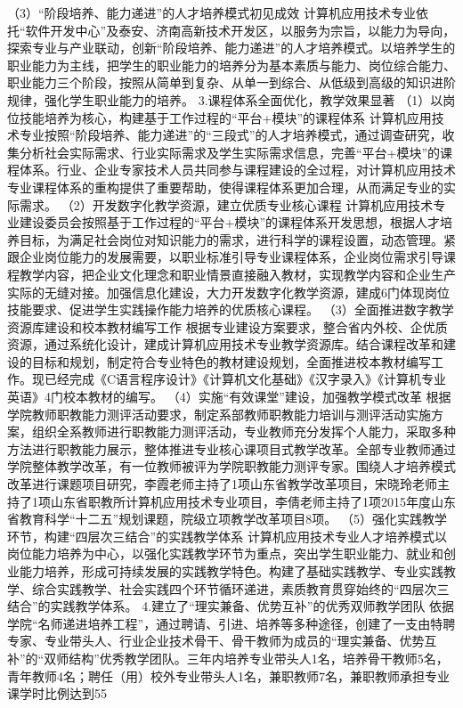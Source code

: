 （3）“阶段培养、能力递进”的人才培养模式初见成效
计算机应用技术专业依托“软件开发中心”及泰安、济南高新技术开发区，以服务为宗旨，以能力为导向，探索专业与产业联动，创新“阶段培养、能力递进”的人才培养模式。以培养学生的职业能力为主线，把学生的职业能力的培养分为基本素质与能力、岗位综合能力、职业能力三个阶段，按照从简单到复杂、从单一到综合、从低级到高级的知识进阶规律，强化学生职业能力的培养。
3.课程体系全面优化，教学效果显著
（1）以岗位技能培养为核心，构建基于工作过程的“平台+模块”的课程体系
计算机应用技术专业按照“阶段培养、能力递进”的“三段式”的人才培养模式，通过调查研究，收集分析社会实际需求、行业实际需求及学生实际需求信息，完善“平台+模块”的课程体系。行业、企业专家技术人员共同参与课程建设的全过程，对计算机应用技术专业课程体系的重构提供了重要帮助，使得课程体系更加合理，从而满足专业的实际需求。
（2）开发数字化教学资源，建立优质专业核心课程
计算机应用技术专业建设委员会按照基于工作过程的“平台+模块”的课程体系开发思想，根据人才培养目标，为满足社会岗位对知识能力的需求，进行科学的课程设置，动态管理。紧跟企业岗位能力的发展需要，以职业标准引导专业课程体系，企业岗位需求引导课程教学内容，把企业文化理念和职业情景直接融入教材，实现教学内容和企业生产实际的无缝对接。加强信息化建设，大力开发数字化教学资源，建成6门体现岗位技能要求、促进学生实践操作能力培养的优质核心课程。
（3）全面推进数字教学资源库建设和校本教材编写工作
根据专业建设方案要求，整合省内外校、企优质资源，通过系统化设计，建成计算机应用技术专业教学资源库。结合课程改革和建设的目标和规划，制定符合专业特色的教材建设规划，全面推进校本教材编写工作。现已经完成《C语言程序设计》《计算机文化基础》《汉字录入》《计算机专业英语》4门校本教材的编写。
（4）实施“有效课堂”建设，加强教学模式改革
根据学院教师职教能力测评活动要求，制定系部教师职教能力培训与测评活动实施方案，组织全系教师进行职教能力测评活动，专业教师充分发挥个人能力，采取多种方法进行职教能力展示，整体推进专业核心课项目式教学改革。全部专业教师通过学院整体教学改革，有一位教师被评为学院职教能力测评专家。围绕人才培养模式改革进行课题项目研究，李霞老师主持了1项山东省教学改革项目，宋晓玲老师主持了1项山东省职教所计算机应用技术专业项目，李倩老师主持了1项2015年度山东省教育科学“十二五”规划课题，院级立项教学改革项目8项。
（5）强化实践教学环节，构建“四层次三结合”的实践教学体系
计算机应用技术专业人才培养模式以岗位能力培养为中心，以强化实践教学环节为重点，突出学生职业能力、就业和创业能力培养，形成可持续发展的实践教学特色。构建了基础实践教学、专业实践教学、综合实践教学、社会实践四个环节循环递进，素质教育贯穿始终的“四层次三结合”的实践教学体系。
4.建立了“理实兼备、优势互补”的优秀双师教学团队
依据学院“名师递进培养工程”，通过聘请、引进、培养等多种途径，创建了一支由特聘专家、专业带头人、行业企业技术骨干、骨干教师为成员的“理实兼备、优势互补”的“双师结构”优秀教学团队。三年内培养专业带头人1名，培养骨干教师5名，青年教师4名；聘任（用）校外专业带头人1名，兼职教师7名，兼职教师承担专业课学时比例达到55%
